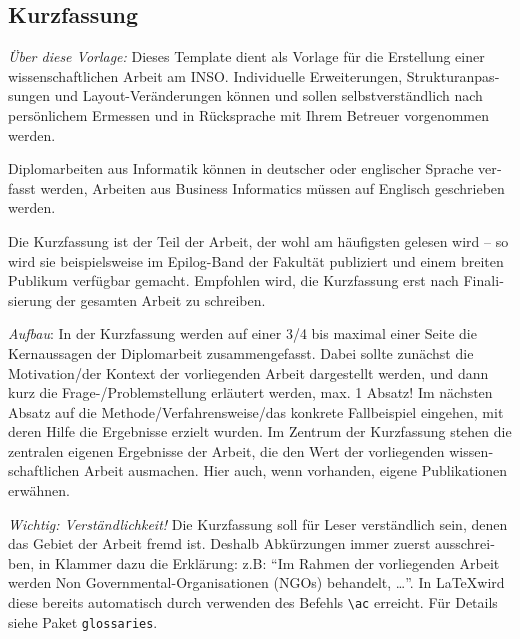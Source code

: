 
\cleardoublepage
{}




\begin{otherlanguage}{ngerman}

  \chapter*{Kurzfassung}

	\emph{Über diese Vorlage:} 
	Dieses Template dient als Vorlage für die Erstellung einer wissenschaftlichen Arbeit am INSO. Individuelle Erweiterungen, Strukturanpassungen und Layout-Veränderungen können und sollen selbstverständlich nach persönlichem Ermessen und in Rücksprache mit Ihrem Betreuer vorgenommen werden.

	\makeatletter\ifthesis@masterthesis
	Diplomarbeiten aus Informatik können in deutscher oder englischer Sprache verfasst werden, Arbeiten aus Business Informatics müssen auf Englisch geschrieben werden.

	Die Kurzfassung ist der Teil der Arbeit, der wohl am häufigsten gelesen wird -- so wird sie beispielsweise im Epilog-Band der Fakultät publiziert und einem breiten Publikum verfügbar gemacht. Empfohlen wird, die Kurzfassung erst nach Finalisierung der gesamten Arbeit zu schreiben.
	\fi\makeatother

	\emph{Aufbau}:
	In der Kurzfassung werden auf einer 3/4 bis maximal einer Seite die Kernaussagen der Diplomarbeit zusammengefasst. Dabei sollte zunächst die Motivation/der Kontext der vorliegenden Arbeit dargestellt werden, und dann kurz die Frage-/Problemstellung erläutert werden, max. 1 Absatz! Im nächsten Absatz auf die Methode/Verfahrensweise/das konkrete Fallbeispiel eingehen, mit deren Hilfe die Ergebnisse erzielt wurden. Im Zentrum der Kurzfassung stehen die zentralen eigenen Ergebnisse der Arbeit, die den Wert der vorliegenden wissenschaftlichen Arbeit ausmachen. Hier auch, wenn vorhanden, eigene Publikationen erwähnen.

	\emph{Wichtig: Verständlichkeit!}
	Die Kurzfassung soll für Leser verständlich sein, denen das Gebiet der Arbeit fremd ist. Deshalb Abkürzungen immer zuerst ausschreiben, in Klammer dazu die Erklärung: z.B: \enquote{Im Rahmen der vorliegenden Arbeit werden Non Governmental-Organisationen (NGOs) behandelt, \ldots}. In \LaTeX wird diese bereits automatisch durch verwenden des Befehls \verb|\ac| erreicht. Für Details siehe Paket \texttt{glossaries}.


\end{otherlanguage}
